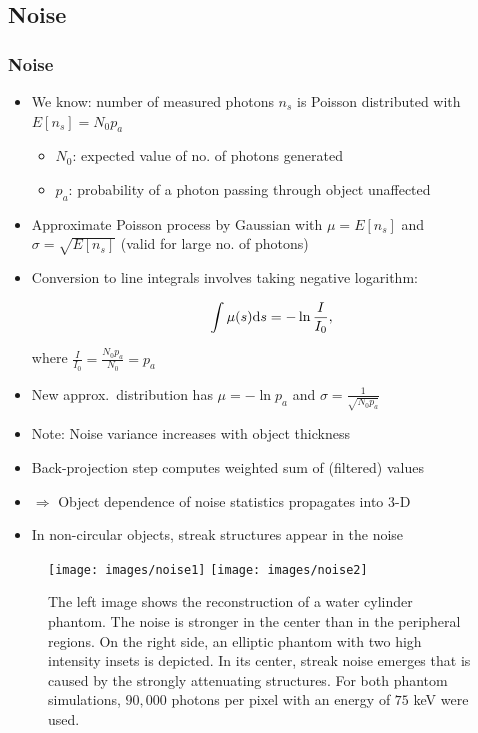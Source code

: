 \subsection{Noise}


\begin{frame}[allowframebreaks]
	\frametitle{Noise}

	\begin{itemize}
		\item We know: number of measured photons $n_s$ is Poisson distributed with
		      $E[n_s] = N_0 p_a$
		      \begin{itemize}
			      \item $N_0$: expected value of no. of photons generated
			      \item $p_a$: probability of a photon passing through object unaffected
		      \end{itemize}
		\item Approximate Poisson process by Gaussian with $\mu = E[n_s]$ and $\sigma = \sqrt{E[n_s]}$ (valid for large no. of photons)

		\item Conversion to line integrals involves taking negative logarithm:

		      \begin{equation}
			      \int \mu(s) \textnormal ds = -\ln\frac{I}{I_0},
		      \end{equation}

		      where $\frac{I}{I_0} = \frac{N_0 p_a}{N_0} = p_a$
		\item New approx.~distribution has $\mu = -\ln p_a$ and $\sigma = \frac{1}{\sqrt{N_0 p_a}}$
		\item Note: Noise variance increases with object thickness

		\item Back-projection step computes weighted sum of (filtered) values
		\item[ ] $\Rightarrow$ Object dependence of noise statistics propagates into 3-D
		\item In non-circular objects, streak structures appear in the noise
	\end{itemize}

	\begin{figure}
		\begin{center}
			\texttt{[image: images/noise1]}
			\hspace{1cm}
			\texttt{[image: images/noise2]}
		\end{center}
		\caption{The left image shows the reconstruction of a water cylinder phantom. The noise is stronger in the center than in the peripheral regions. On the right side, an elliptic phantom with two high intensity insets is depicted. In its center, streak noise emerges that is caused by the strongly attenuating structures. For both phantom simulations, $90{,}000$ photons per pixel with an energy of $75$ keV were used.}%
		\label{fig:ct_noise}
	\end{figure}

\end{frame}


